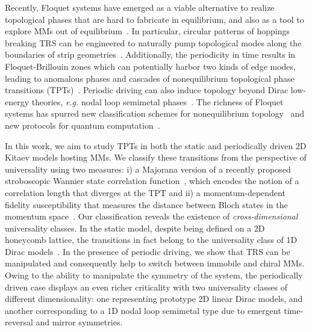 \documentclass[aps,prb,twocolumn,superscriptaddress,groupedaddress]{revtex4}
\begin{document}
Recently, Floquet systems have emerged as a viable alternative to realize topological phases that are hard to fabricate in equilibrium, and also as a tool to explore MMs out of equilibrium~\cite{Jiang:2011,Liu:2013,Thakurathi:2013,Thakurathi:2014,Sacramento:2015, Bhattacharya:2016, Molignini:2017,Thakurathi:2017,Po:2017,Peng:2018,Molignini:2018,Cadez:2019,Molignini:2020-multifrequency}.
In particular, circular patterns of hoppings breaking TRS can be engineered to naturally pump topological modes along the boundaries of strip geometries~\cite{Rudner:2013, Po:2017, Mukherjee:2017, Mukherjee:2018, Yu:2020, Wintersperger:2020}.
Additionally, the periodicity in time results in Floquet-Brillouin zones which can potentially harbor two kinds of edge modes, leading to anomalous phases and cascades of nonequilibrium topological phase transitions (TPTs)~\cite{Rudner:2013, Klinovaja:2016, Mukherjee:2017, Mukherjee:2018, Molignini:2019, Wintersperger:2020}. Periodic driving can also induce topology beyond Dirac low-energy theories, \textit{e.g.} nodal loop semimetal phases~\cite{Li:2018, Molignini:2018}.
The richness of Floquet systems has spurred new classification schemes for nonequilibrium topology~\cite{Rudner:2015,Yao:2017,Harper:2017,Roy:2017,Harper:2020} and new protocols for  quantum computation~\cite{Bauer:2019}.

In this work, we aim to study TPTs in both the static and periodically driven 2D Kitaev models hosting MMs.
We classify these transitions from the perspective of universality using two measures:
i) a Majorana version of a recently proposed stroboscopic Wannier state correlation function~\cite{Chen:2017,Molignini:2018,Chen-Sigrist-book:2019,Chen-Schnyder:2019}, 
which encodes the notion of a correlation length that diverges at the TPT and ii) a momentum-dependent fidelity susceptibility that measures the distance between Bloch states in the momentum space~\cite{Panahiyan20}. 
Our classification reveals the existence of \emph{cross-dimensional} universality classes.
In the static model, despite being defined on a 2D honeycomb lattice, the transitions in fact belong to the universality class of 1D Dirac models~\cite{Chen:2017,Chen-Sigrist-book:2019,Chen-Schnyder:2019}.
In the presence of periodic driving, we show that TRS can be manipulated and consequently help to switch between immobile and chiral MMs.
Owing to the ability to manipulate the symmetry of the system, the periodically driven case displays an even richer criticality with two universality classes of different dimensionality: one representing prototype 2D linear Dirac models, and another corresponding to a 1D nodal loop semimetal type due to emergent time-reversal and mirror symmetries.
\end{document}
